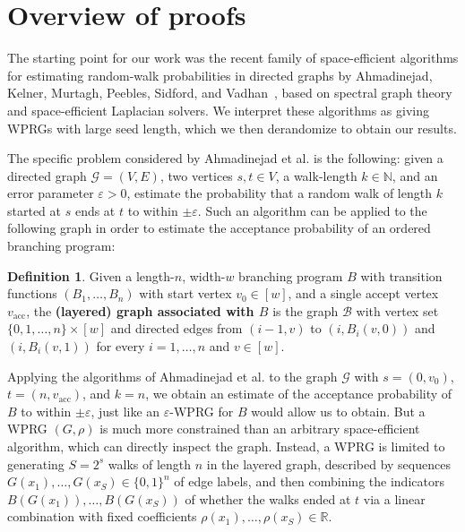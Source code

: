 \documentclass[11pt]{article}
\numberwithin{equation}{section}
\theoremstyle{definition}
\newtheorem{definition}[theorem]{Definition}
\theoremstyle{plain}
\newcommand{\R}{\mathbb R}
\newcommand{\N}{\mathbb N}
\newcommand{\eps}{\varepsilon}
\newcommand{\zo}{\{0,1\}}
\newcommand{\cB}{\mathcal{B}}
\newcommand{\cG}{\mathcal{G}}
\newcommand{\va}{v_{\text{acc}}}
\begin{document}
\section{Overview of proofs}
The starting point for our %
%
work was %
the recent
family of %
%
%
space-efficient algorithms for estimating
random-walk probabilities in directed graphs by
%
Ahmadinejad, %
Kelner, Murtagh,
Peebles, Sidford, and Vadhan~\cite{AhmadinejadKeMuPeSiVa19}, %
%
based on spectral graph
theory and space-efficient Laplacian solvers. 
    We interpret these algorithms as giving WPRGs with large seed length, which we then derandomize to obtain our results.  
    
    The specific problem considered by %
Ahmadinejad  %
et al. is the following: given a directed graph $\cG=(V,E)$, two vertices $s,t\in V$, a walk-length $k\in \N$, and an error parameter $\eps>0$, estimate the probability that a random walk of length $k$ started at $s$ ends at $t$ to within $\pm \eps$.  Such an algorithm can be applied to the following graph in order to estimate the acceptance probability of an ordered branching program:
    \begin{definition} \label{def:OBP_graph}
%
Given a length-$n$, width-$w$    %
branching program $B$ with transition functions $(B_1,\ldots,B_n)$ with start vertex $v_0\in [w]$, and a single accept vertex $\va$, the \textbf{(layered) graph associated with $B$} is the graph $\cB$ with vertex set $\{0,1,\ldots,n\}\times[w]$ and directed edges from $(i-1,v)$ to
        $(i,B_i(v,0))$ and $(i,B_i(v,1))$ for every $i=1,\ldots,n$ and $v\in [w]$.
    \end{definition} 
    Applying the algorithms of %
Ahmadinejad  %
et al. to the graph $\cG$ with $s=(0,v_0)$, $t=(n,\va)$, and $k=n$, we obtain an estimate of the acceptance probability of $B$ to within $\pm \eps$, just like an $\eps$-WPRG for $B$ would allow us to obtain. But a WPRG $(G,\rho)$ is much more constrained than an arbitrary space-efficient algorithm, which can directly inspect the graph. Instead, a WPRG is limited to generating $S=2^s$ walks of length $n$ in the layered graph, described by sequences $G(x_1),\ldots, G(x_S)\in \zo^n$ of edge labels, and then combining the indicators $B(G(x_1)),\ldots,B(G(x_S))$ of whether the walks ended at $t$ via a linear combination with fixed coefficients $\rho(x_1),\ldots,\rho(x_S)\in \R$.
    
\end{document}
